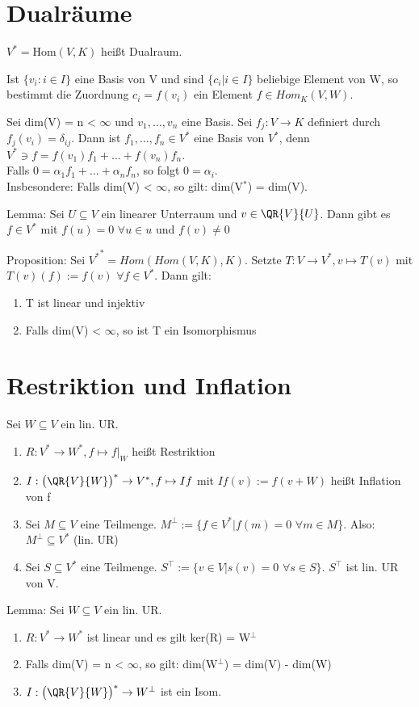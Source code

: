 \section{Dualräume}
$V^* = \text{Hom}(V, K)$ heißt Dualraum.
\begin{compactitem}
\item Ist $\{ v_i : i \in I \}$ eine Basis von V und sind $\{ c_i | i \in I \}$ beliebige Element von W, so bestimmt die Zuordnung $c_i = f(v_i)$ ein Element $f \in Hom_K(V,W)$.
\item Sei dim(V) = n < $\infty$ und $v_1, …, v_n$ eine Basis. Sei $f_j: V \to K$ definiert durch $f_j(v_i) = \delta_{ij}$. Dann ist $f_1, …, f_n \in V^*$ eine Basis von $V^*$, denn $V^* \ni f = f(v_1)f_1 + … + f(v_n)f_n$.\\
Falls $0 = \alpha_1 f_1 + … + \alpha_n f_n$, so folgt $0 = \alpha_i$.\\
Insbesondere: Falls dim(V) < $\infty$, so gilt: dim(V$^*$) = dim(V).
\item Lemma: Sei $U \subseteq V$ ein linearer Unterraum und $v \in \QR{V}{U}$. 
Dann gibt es $f \in V^*$ mit $f(u) = 0$ $\forall u \in u$ und $f(v) \neq 0$
\item Proposition: Sei ${V^*}^* = Hom(Hom(V,K), K)$. Setzte $T: V \to V^*, v \mapsto T(v)$ mit $T(v)(f) := f(v)$ $\forall f \in V^*$. Dann gilt:
\begin{enumerate}
\item T ist linear und injektiv
\item Falls dim(V) < $\infty$, so ist T ein Isomorphismus
\end{enumerate}
\end{compactitem}

\section{Restriktion und Inflation}
Sei $W \subseteq V$ ein lin. UR.
\begin{enumerate}
\item $R: V^* \to W^*, f \mapsto f|_W$ heißt Restriktion
\item $I: \big(\QR{V}{W}\big)^* \to V^*, f \mapsto If$ mit $If(v) := f(v + W)$ heißt Inflation von f
\item Sei $M \subseteq V$ eine Teilmenge. $M^\perp := \{ f \in V^* | f(m) = 0$ $\forall m \in M \}$. Also: $M^\perp \subseteq V^*$ (lin. UR)
\item Sei $S \subseteq V^*$ eine Teilmenge. $S^\top := \{ v \in V | s(v) = 0$ $\forall s \in S \}$. $S^\top$ ist lin. UR von V.
\end{enumerate}
Lemma: Sei $W \subseteq V$ ein lin. UR.
\begin{enumerate}
\item $R: V^* \to W^*$ ist linear und es gilt ker(R) = W$^\perp$
\item Falls dim(V) = n < $\infty$, so gilt: dim(W$^\perp$) = dim(V) - dim(W)
\item $I: \big(\QR{V}{W}\big)^* \to W^\perp$ ist ein Isom.
\end{enumerate}

